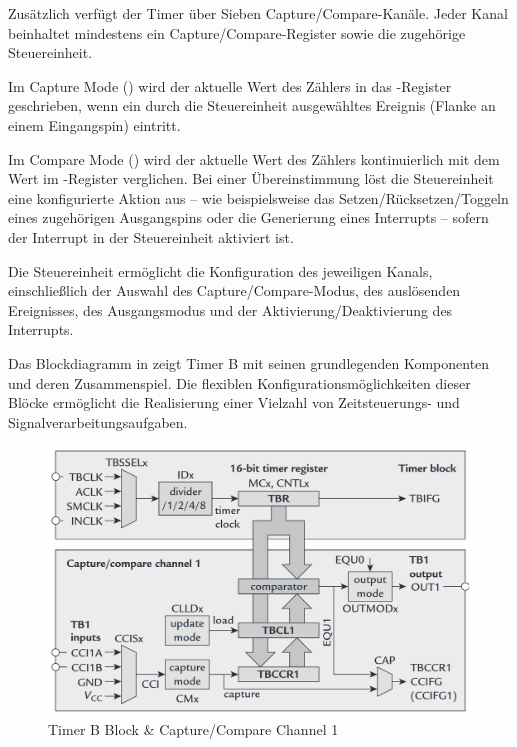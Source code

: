 Zus\"atzlich verf\"ugt der Timer \"uber Sieben Capture/Compare-Kan\"ale. Jeder Kanal beinhaltet mindestens ein Capture/Compare-Register sowie die zugeh\"orige Steuereinheit.

Im Capture Mode () wird der aktuelle Wert des Z\"ahlers in das -Register geschrieben, wenn ein durch die Steuereinheit ausgew\"ahltes Ereignis (\zB Flanke an einem Eingangspin) eintritt.

Im Compare Mode () wird der aktuelle Wert des Z\"ahlers kontinuierlich mit dem Wert im -Register verglichen. Bei einer \"Ubereinstimmung l\"ost die Steuereinheit eine konfigurierte Aktion aus -- wie beispielsweise das Setzen/R\"ucksetzen/Toggeln eines zugeh\"origen Ausgangspins oder die Generierung eines Interrupts -- sofern der Interrupt in der Steuereinheit aktiviert ist.

Die Steuereinheit erm\"oglicht die Konfiguration des jeweiligen Kanals, einschlie{\ss}lich der Auswahl des Capture/Compare-Modus, des ausl\"osenden Ereignisses, des Ausgangsmodus und der Aktivierung/Deaktivierung des Interrupts.

Das Blockdiagramm in  zeigt Timer B mit seinen grundlegenden Komponenten und deren Zusammenspiel. Die flexiblen Konfigurationsm\"oglichkeiten dieser Bl\"ocke erm\"oglicht die Realisierung einer Vielzahl von Zeitsteuerungs- und Signalverarbeitungsaufgaben.

\newpage
\vspace{1cm}
\begin{figure}[h!]
	\centering
	\includegraphics[width=1.0\textwidth]{../Bilder/BlockDiagram_TimerB.png}
	\caption{Timer B Block \& Capture/Compare Channel 1\\}
	\label{fig:BlockDiagramm_Timer}
\end{figure}

